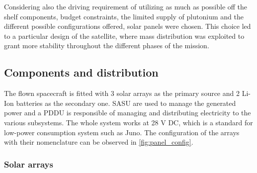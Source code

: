 Considering also the driving requirement of utilizing as much as possible off the shelf components, budget constraints, the limited supply of plutonium and the different possible configurations offered, solar panels were chosen. This choice led to a particular design of the satellite, where mass distribution was exploited to grant more stability throughout the different phases of the mission.  

\subsection{Components and distribution}
\label{subsec:components_and_distribution}

The flown spacecraft is fitted with 3 solar arrays as the primary source and 2 Li-Ion batteries as the secondary one. SASU are used to manage the generated power and a PDDU is responsible of managing and distributing electricity to the various subsystems.
The whole system works at 28 V DC, which is a standard for low-power consumption system such as Juno. The configuration of the arrays with their nomenclature can be observed in \autoref{fig:panel_config}.

\subsubsection{Solar arrays}
\label{susubsec:solar_arrays}

